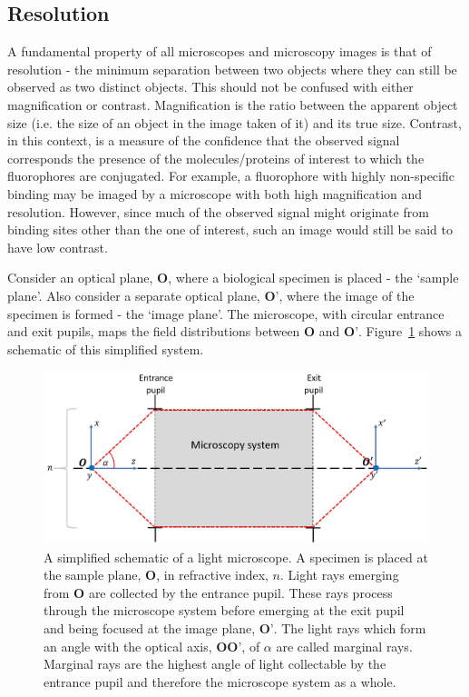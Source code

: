 \subsection{Resolution}
\label{subsec:resolution}

A fundamental property of all microscopes and microscopy images is that of 
resolution - the minimum separation between two objects where they can still
be observed as two distinct objects. This should not be confused with 
either magnification or contrast. Magnification is the ratio between the 
apparent object size (i.e. the size of an object in the image taken of it) 
and its true size. Contrast, in this context, is a measure of the confidence 
that the observed signal corresponds the presence of the molecules/proteins 
of interest to which the fluorophores are conjugated. For example, a 
fluorophore with highly non-specific binding may be imaged by a microscope with 
both high magnification and resolution. However, since much of the observed 
signal might originate from binding sites other than the one of interest, 
such an image would still be said to have low contrast.

Consider an optical plane, $\textbf{O}$, where a biological specimen is 
placed - the `sample plane'. Also consider a separate optical plane, 
$\textbf{O'}$, where the image of the specimen is formed - the `image plane'. 
The microscope, with circular entrance and exit pupils, maps the field 
distributions between $\textbf{O}$ and $\textbf{O'}$. 
Figure~\ref{fig:simplified_microscope_layout} shows a schematic of this 
simplified system.

\begin{figure}[h]
	\centering
	\includegraphics[width=\textwidth]{images/simplified_microscope_layout.jpg}
	\caption[A simplified schematic of a light microscope.]{A simplified 
		schematic of a light microscope. A specimen 
		is placed at the sample plane, $\textbf{O}$, in refractive index, $n$. Light 
		rays emerging from $\textbf{O}$ are collected by the entrance pupil. These 
		rays process through the microscope system before emerging at the exit pupil 
		and being focused at the image plane, $\textbf{O'}$. The light rays which 
		form an angle with the optical axis, $\textbf{OO'}$, of $\alpha$ are called
		marginal rays. Marginal rays are the highest angle of light  collectable by
		the entrance pupil and therefore the microscope system as a whole.}
	\label{fig:simplified_microscope_layout}
\end{figure}

